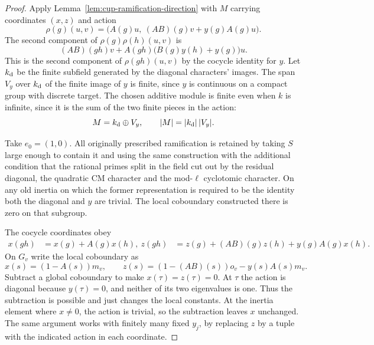 \begin{proof}
Apply Lemma~\ref{lem:cup-ramification-direction} with \(M\)
carrying coordinates \((x,z)\)
and action
\[
 \rho(g)(u,v)=\bigl(A(g)u,\ (AB)(g)v+y(g)A(g)u\bigr).
\]
The second component of \(\rho(g)\rho(h)(u,v)\) is
\[
 (AB)(gh)v+
 A(gh)\bigl(B(g)y(h)+y(g)\bigr)u .
\]
This is the second component of \(\rho(gh)(u,v)\) by the cocycle
identity for \(y\). Let \(k_{\rm d}\) be the finite subfield generated
by the diagonal characters' images. The span \(V_y\) over
\(k_{\rm d}\) of the finite image of \(y\) is finite, since \(y\) is
continuous on a compact group with discrete target. The chosen additive module is finite even when \(k\) is infinite, since it is the sum of the two finite pieces in the action:
\[
 M=k_{\rm d}\oplus V_y,\qquad |M|=|k_{\rm d}|\,|V_y| .
\]

Take \(e_0=(1,0)\).
All originally prescribed ramification is retained by taking
\(S\) large enough to contain it and using the same construction
with the additional condition that the rational primes split in
the field cut out by the residual diagonal, the quadratic CM
character and the mod-\(\ell\) cyclotomic character. On any old
inertia on which the former representation is required to be
the identity both the diagonal and \(y\) are trivial. The local
coboundary constructed there is zero on that subgroup.

The cocycle coordinates obey
\[
\begin{aligned}
 x(gh)&=x(g)+A(g)x(h),\
 z(gh)&=z(g)+(AB)(g)z(h)+y(g)A(g)x(h).
\end{aligned}
\]
On \(G_v\) write the local coboundary as
\[
 x(s)=(1-A(s))m_v,\qquad
 z(s)=(1-(AB)(s))o_v-y(s)A(s)m_v .
\]
Subtract a global coboundary to make \(x(\tau)=z(\tau)=0\).
At \(\tau\) the action is diagonal because \(y(\tau)=0\), and
neither of its two eigenvalues is one. Thus the subtraction is
possible and just changes the local constants. At the inertia element where \(x\ne0\), the action is trivial, so the subtraction leaves \(x\) unchanged. The same argument works with finitely
many fixed \(y_j\), by replacing \(z\) by a tuple with the indicated
action in each coordinate.


\end{proof}
